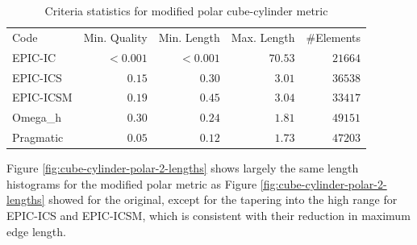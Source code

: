 \documentclass[3p,times,procedia,number]{elsarticle}
\begin{document}
\begin{table}
\caption{Criteria statistics for modified polar cube-cylinder metric}
\label{tab:polar-2-stats}
\begin{tabular}{lrrrr}
Code & Min. Quality & Min. Length & Max. Length & \#Elements\\
EPIC-IC    &$<0.001$&     $<0.001$&      $70.53$&    $21664$\\
EPIC-ICS   &$  0.15$&     $  0.30$&      $ 3.01$&    $36538$\\
EPIC-ICSM  &$  0.19$&     $  0.45$&      $ 3.04$&    $33417$\\
Omega\_h   &$  0.30$&     $  0.24$&      $ 1.81$&    $49151$\\
Pragmatic  &$  0.05$&     $  0.12$&      $ 1.73$&    $47203$\\
\end{tabular}
\end{table}

Figure \ref{fig:cube-cylinder-polar-2-lengths} shows largely the
same length histograms for the modified polar metric as
Figure \ref{fig:cube-cylinder-polar-2-lengths} showed for the original,
except for the tapering into the high range for EPIC-ICS and EPIC-ICSM,
which is consistent with their reduction in maximum edge length.
\end{document}
